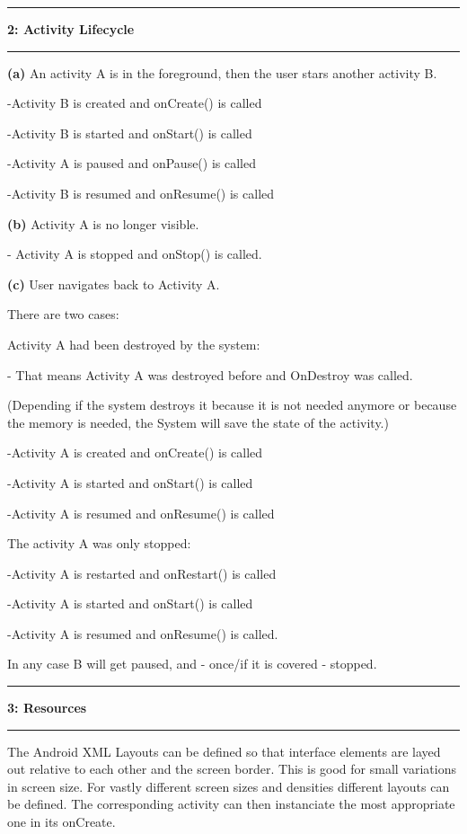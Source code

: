 \documentclass[11pt]{article}
\newcommand\question[2]{\vspace{.25in}\hrule\textbf{#1: #2}\vspace{.5em}\hrule\vspace{.10in}}
\renewcommand\part[1]{\vspace{.10in}\textbf{(#1)}}
\begin{document}
\question{2}{Activity Lifecycle} 
\part{a} An activity A is in the foreground, then the user stars another activity B.
 
 -Activity B is created and onCreate() is called
 
 -Activity B is started and onStart() is called
 
 -Activity A is paused and onPause() is called
 
 -Activity B is resumed and onResume() is called

\part{b} Activity A is no longer visible.

- Activity A is stopped and onStop() is called.

\part{c} User navigates back to Activity A.

There are two cases:

Activity A had been destroyed by the system:

- That means Activity A was destroyed before and OnDestroy was called.

(Depending if the system destroys it because it is not needed anymore or because the memory is needed, the System will save the state of the activity.)

-Activity A is created and onCreate() is called

-Activity A is started and onStart() is called

-Activity A is resumed and onResume() is called

The activity A was only stopped:

-Activity A is restarted and onRestart() is called

-Activity A is started and onStart() is called

-Activity A is resumed and onResume() is called.

In any case B will get paused, and  - once/if it is covered - stopped.

\question{3}{Resources}

The Android XML Layouts can be defined so that interface elements are layed out relative to each other and the screen border. This is good for small variations in screen size. For vastly different screen sizes and densities different layouts can be defined. The corresponding activity can then instanciate the most appropriate one in its onCreate.
\end{document}
